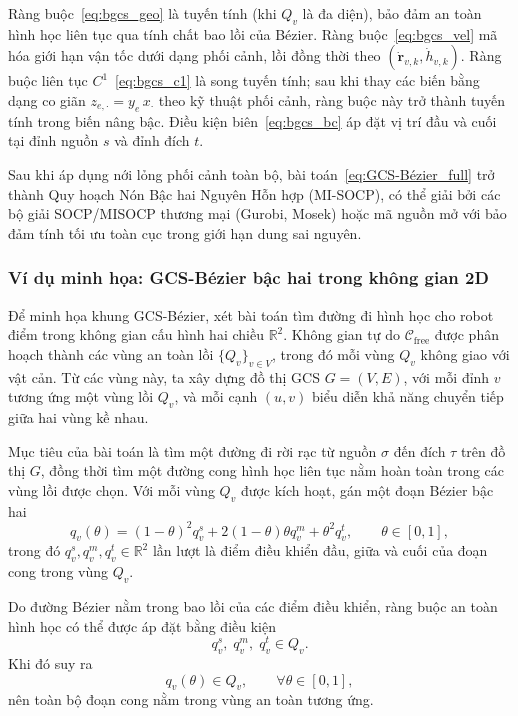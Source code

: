 Ràng buộc~\eqref{eq:bgcs_geo} là tuyến tính (khi $Q_v$ là đa diện), bảo đảm an
toàn hình học liên tục qua tính chất bao lồi của Bézier. Ràng
buộc~\eqref{eq:bgcs_vel} mã hóa giới hạn vận tốc dưới dạng phối cảnh, lồi đồng
thời theo $(\dot{\mathbf{r}}_{v,k}, \dot{h}_{v,k})$. Ràng buộc liên tục
$C^1$~\eqref{eq:bgcs_c1} là song tuyến tính; sau khi thay các biến bằng dạng co
giãn $z_{e,\cdot} = y_e\, x_\cdot$ theo kỹ thuật phối cảnh, ràng buộc này trở
thành tuyến tính trong biến nâng bậc. Điều kiện biên~\eqref{eq:bgcs_bc} áp đặt
vị trí đầu và cuối tại đỉnh nguồn $s$ và đỉnh đích $t$.

Sau khi áp dụng nới lỏng phối cảnh toàn bộ, bài toán~\eqref{eq:GCS-Bézier_full}
trở thành Quy hoạch Nón Bậc hai Nguyên Hỗn hợp (MI-SOCP), có thể giải bởi các
bộ giải SOCP/MISOCP thương mại (Gurobi, Mosek) hoặc mã nguồn mở với bảo đảm tính tối ưu toàn cục trong giới hạn dung sai nguyên.

\subsubsection{Ví dụ minh họa: GCS-Bézier bậc hai trong không gian 2D}
\label{subsubsec:GCS-Bézier_example2d}

Để minh họa khung GCS-Bézier, xét bài toán tìm đường đi hình học cho robot điểm
trong không gian cấu hình hai chiều $\mathbb{R}^2$. Không gian tự do
$\mathcal{C}_{\mathrm{free}}$ được phân hoạch thành các vùng an toàn lồi
$\{Q_v\}_{v\in V}$, trong đó mỗi vùng $Q_v$ không giao với vật cản. Từ các vùng
này, ta xây dựng đồ thị GCS $G=(V,E)$, với mỗi đỉnh $v$ tương ứng một vùng lồi
$Q_v$, và mỗi cạnh $(u,v)$ biểu diễn khả năng chuyển tiếp giữa hai vùng kề nhau.

Mục tiêu của bài toán là tìm một đường đi rời rạc từ nguồn $\sigma$ đến đích
$\tau$ trên đồ thị $G$, đồng thời tìm một đường cong hình học liên tục nằm hoàn
toàn trong các vùng lồi được chọn. Với mỗi vùng $Q_v$ được kích hoạt, gán một
đoạn Bézier bậc hai
\begin{equation}
    q_v(\theta)
    =
    (1-\theta)^2 q_v^s
    + 2(1-\theta)\theta q_v^m
    + \theta^2 q_v^t,
    \qquad \theta\in[0,1],
\end{equation}
trong đó $q_v^s,q_v^m,q_v^t\in\mathbb{R}^2$ lần lượt là điểm điều khiển đầu,
giữa và cuối của đoạn cong trong vùng $Q_v$.

Do đường Bézier nằm trong bao lồi của các điểm điều khiển, ràng buộc an toàn
hình học có thể được áp đặt bằng điều kiện
\begin{equation}
    q_v^s,\;q_v^m,\;q_v^t \in Q_v.
\end{equation}
Khi đó suy ra
\begin{equation}
    q_v(\theta)\in Q_v,\qquad \forall \theta\in[0,1],
\end{equation}
nên toàn bộ đoạn cong nằm trong vùng an toàn tương ứng.

